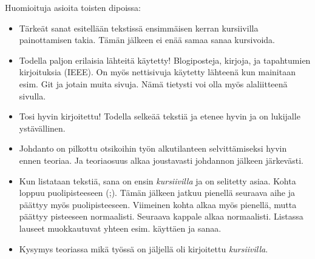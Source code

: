 \begin{it}
	Huomioituja asioita toisten dipoissa:
	\begin{itemize}
		\item Tärkeät sanat esitellään tekstissä ensimmäisen kerran kursiivilla painottamisen takia. Tämän jälkeen ei enää samaa sanaa kursivoida.
		\item Todella paljon erilaisia lähteitä käytetty! Blogiposteja, kirjoja, ja tapahtumien kirjoituksia (IEEE). On myös nettisivuja käytetty lähteenä kun mainitaan esim. Git ja jotain muita sivuja. Nämä tietysti voi olla myös alaliitteenä sivulla.
		\item Tosi hyvin kirjoitettu! Todella selkeää tekstiä ja etenee hyvin ja on lukijalle ystävällinen.
		\item Johdanto on pilkottu otsikoihin työn alkutilanteen selvittämiseksi hyvin ennen teoriaa. Ja teoriaosuus alkaa joustavasti johdannon jälkeen järkevästi.
		\item Kun listataan tekstiä, sana on ensin \emph{kursiivilla} ja on selitetty asiaa. Kohta loppuu puolipisteeseen (;). Tämän jälkeen jatkuu pienellä seuraava aihe ja päättyy myös puolipisteeseen. Viimeinen kohta alkaa myös pienellä, mutta päättyy pisteeseen normaalisti. Seuraava kappale alkaa normaalisti. Listassa lauseet muokkautuvat yhteen esim. käyttäen ja sanaa.
		\item Kysymys teoriassa mikä työssä on jäljellä oli kirjoitettu \emph{kursiivilla}.
	\end{itemize}
\end{it}